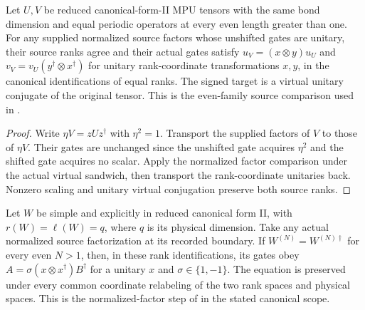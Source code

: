 \begin{lemma}
    \label{lem:mpu_even_family_supplied_source_gauges}
    \leanok
    Let $U,V$ be reduced canonical-form-II MPU tensors with the same bond
    dimension and equal periodic operators at every even length greater than
    one. For any supplied normalized source factors whose unshifted gates
    are unitary, their source ranks agree and their actual gates satisfy
    $u_V=(x\otimes y)u_U$ and $v_V=v_U(y^\dagger\otimes x^\dagger)$
    for unitary rank-coordinate transformations $x,y$, in the canonical
    identifications of equal ranks. The signed target is a virtual unitary
    conjugate of the original tensor. This is the even-family source
    comparison used in \cite[lines~1237--1252]{Cirac2017MPU}.
\end{lemma}

\begin{proof}\leanok
    Write $\eta V=zUz^\dagger$ with $\eta^2=1$. Transport the supplied
    factors of $V$ to those of $\eta V$. Their gates are unchanged since
    the unshifted gate acquires $\eta^2$ and the shifted gate acquires no
    scalar. Apply the normalized factor comparison under the actual virtual
    sandwich, then transport the rank-coordinate unitaries back. Nonzero
    scaling and unitary virtual conjugation preserve both source ranks.
\end{proof}

\begin{lemma}
    \label{lem:mpu_normalized_source_forward_adjoint_certificate}
    \leanok
    Let $W$ be simple and explicitly in reduced canonical form II, with
    $r(W)=\ell(W)=q$, where $q$ is its physical dimension.
    Take any actual normalized source factorization at its recorded boundary.
    If $W^{(N)}=W^{(N)\dagger}$ for every even $N>1$, then, in these rank
    identifications, its gates obey
    $A=\sigma(x\otimes x^\dagger)B^\dagger$ for a unitary $x$ and
    $\sigma\in\{1,-1\}$. The equation is preserved under every common
    coordinate relabeling of the two rank spaces and physical spaces.
    This is the normalized-factor step of
    \cite[lines~1237--1252]{Cirac2017MPU} in the stated canonical scope.
\end{lemma}

